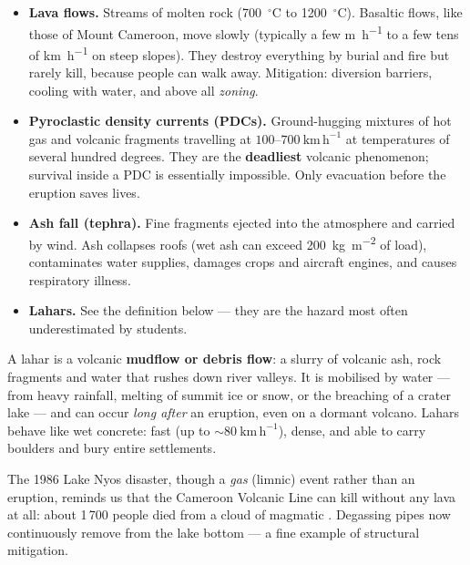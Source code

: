 \documentclass[11pt]{article}
\newcommand{\cle}[1]{{\popxbold\color{popdark}#1}}
\begin{document}
\begin{itemize}
\item \textbf{Lava flows.} Streams of molten rock (\SI{700}{\ensuremath{{}^{\circ}\mathrm{C}}} to \SI{1200}{\ensuremath{{}^{\circ}\mathrm{C}}}). Basaltic flows, like those of Mount Cameroon, move slowly (typically a few \si{m.h^{-1}} to a few tens of \si{km.h^{-1}} on steep slopes). They destroy everything by burial and fire but rarely kill, because people can walk away. Mitigation: diversion barriers, cooling with water, and above all \emph{zoning}.
\item \textbf{Pyroclastic density currents (PDCs).} Ground-hugging mixtures of hot gas and volcanic fragments travelling at $100$--$700\ \mathrm{km\,h^{-1}}$ at temperatures of several hundred degrees. They are the \textbf{deadliest} volcanic phenomenon; survival inside a PDC is essentially impossible. Only evacuation before the eruption saves lives.
\item \textbf{Ash fall (tephra).} Fine fragments ejected into the atmosphere and carried by wind. Ash collapses roofs (wet ash can exceed \SI{200}{kg.m^{-2}} of load), contaminates water supplies, damages crops and aircraft engines, and causes respiratory illness.
\item \textbf{Lahars.} See the definition below — they are the hazard most often underestimated by students.
\end{itemize}

\begin{definition}[Lahar]
A \cle{lahar} is a volcanic \textbf{mudflow or debris flow}: a slurry of volcanic ash, rock fragments and water that rushes down river valleys. It is mobilised by water — from heavy rainfall, melting of summit ice or snow, or the breaching of a crater lake — and can occur \emph{long after} an eruption, even on a dormant volcano. Lahars behave like wet concrete: fast (up to $\sim 80\ \mathrm{km\,h^{-1}}$), dense, and able to carry boulders and bury entire settlements.
\end{definition}

\begin{savaistu}
The 1986 Lake Nyos disaster, though a \emph{gas} (limnic) event rather than an eruption, reminds us that the Cameroon Volcanic Line can kill without any lava at all: about 1\,700 people died from a cloud of magmatic . Degassing pipes now continuously remove  from the lake bottom — a fine example of structural mitigation.
\end{savaistu}
\end{document}
